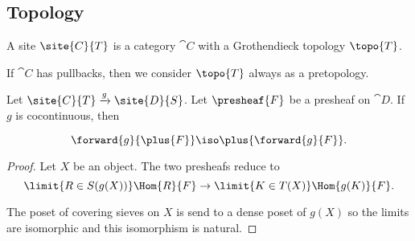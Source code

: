 \subsection{Topology}







\begin{definition}[Site]
A site $\site{C}{T}$ is a category $\cat{C}$ with a Grothendieck topology $\topo{T}$.
\end{definition}

If $\cat{C}$ has pullbacks, then we consider $\topo{T}$ always as a pretopology.

\begin{definition}


\end{definition}

\begin{lemma}
Let $\site{C}{T}\xrightarrow{g} \site{D}{S}$. Let $\presheaf{F}$ be a presheaf on $\cat{D}$.
If $g$ is cocontinuous, then 

\[\forward{g}{\plus{F}} \iso \plus{\forward{g}{F}}.\]
\end{lemma}
\begin{proof}
Let $X$ be an object.
The two presheafs reduce to
\[ \limit{R\in S(g(X))} \Hom{R}{F} \rightarrow \limit{K\in T(X)} \Hom{g(K)}{F}.\]

The poset of covering sieves on $X$ is send to a dense
poset of $g(X)$ so the limits are isomorphic and this isomorphism is natural.
\end{proof}